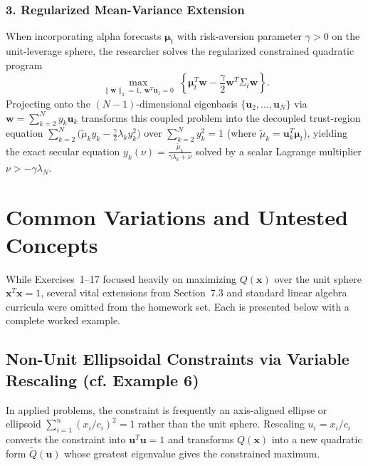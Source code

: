 \documentclass[11pt, letterpaper]{article}
\theoremstyle{definition}
\theoremstyle{remark}
\begin{document}
\subsubsection*{3. Regularized Mean-Variance Extension}
When incorporating alpha forecasts $\boldsymbol{\mu}_t$ with risk-aversion parameter $\gamma > 0$ on the unit-leverage sphere, the researcher solves the regularized constrained quadratic program
\[
\max_{\|\mathbf{w}\|_2 = 1,\ \mathbf{w}^T \mathbf{u}_1 = 0} \; \left\{ \boldsymbol{\mu}_t^T \mathbf{w} - \frac{\gamma}{2} \mathbf{w}^T \Sigma_t \mathbf{w} \right\}.
\]
Projecting onto the $(N-1)$-dimensional eigenbasis $\{\mathbf{u}_2, \dots, \mathbf{u}_N\}$ via $\mathbf{w} = \sum_{k=2}^N y_k \mathbf{u}_k$ transforms this coupled problem into the decoupled trust-region equation $\sum_{k=2}^N \bigl(\tilde{\mu}_k y_k - \frac{\gamma}{2}\lambda_k y_k^2\bigr)$ over $\sum_{k=2}^N y_k^2 = 1$ (where $\tilde{\mu}_k = \mathbf{u}_k^T \boldsymbol{\mu}_t$), yielding the exact secular equation $y_k(\nu) = \frac{\tilde{\mu}_k}{\gamma \lambda_k + \nu}$ solved by a scalar Lagrange multiplier $\nu > -\gamma \lambda_N$.

\section{Common Variations and Untested Concepts}

While Exercises~1–17 focused heavily on maximizing $Q(\mathbf{x})$ over the unit sphere $\mathbf{x}^T \mathbf{x} = 1$, several vital extensions from Section~7.3 and standard linear algebra curricula were omitted from the homework set. Each is presented below with a complete worked example.

\subsection{Non-Unit Ellipsoidal Constraints via Variable Rescaling (cf. Example 6)}
In applied problems, the constraint is frequently an axis-aligned ellipse or ellipsoid $\sum_{i=1}^n (x_i / c_i)^2 = 1$ rather than the unit sphere. Rescaling $u_i = x_i / c_i$ converts the constraint into $\mathbf{u}^T \mathbf{u} = 1$ and transforms $Q(\mathbf{x})$ into a new quadratic form $\tilde{Q}(\mathbf{u})$ whose greatest eigenvalue gives the constrained maximum.
\end{document}
